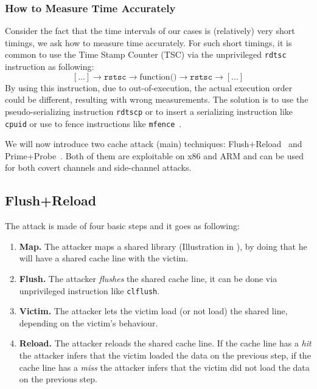 \subsubsection{How to Measure Time Accurately}
\label{subsubsec:howtomeasuretimeaccuractely}
Consider the fact that the time intervals of our cases is (relatively) very
short timings, we ask how to measure time accurately. For such short timings, it
is common to use the Time Stamp Counter (TSC) via the unprivileged
\texttt{rdtsc} instruction as following:
$$[...] \rightarrow \texttt{rstsc} \rightarrow \mbox{function()} \rightarrow
\texttt{rstsc} \rightarrow [...]$$ \noindent By using this instruction, due to
out-of-execution, the actual execution order could be different, resulting with
wrong measurements. The solution is to use the pseudo-serializing instruction
\texttt{rdtscp} or to insert a serializing instruction like \texttt{cpuid} or
use to fence instructions like \texttt{mfence}~\cite{benchmark2010}.

We will now introduce two cache attack (main) techniques:
Flush+Reload~\cite{Gullasch:2011:CGB:2006077.2006784,
Osvik:2006:CAC:2117739.2117741, Yarom2014} and
Prime+Probe~\cite{Percival2009,Osvik:2006:CAC:2117739.2117741,Liu:2015:LCS:2867539.2867673}.
Both of them are exploitable on x86 and ARM and can be used for both covert
channels and side-channel attacks.
\subsection{Flush+Reload}
\label{subsec:flushreload}
The attack is made of four basic steps and it goes as following:
\begin{enumerate}
    \item \textbf{Map. } The attacker maps a shared library (Illustration in
    ), by doing that he will have a shared cache line
    with the victim.
    \item \textbf{Flush.} The attacker \textit{flushes} the shared cache line,
    it can be done via unprivileged instruction like \texttt{clflush}.
    \item \textbf{Victim.} The attacker lets the victim load (or not load) the
    shared line, depending on the victim's behaviour.
    \item \textbf{Reload.} The attacker reloads the shared cache line. If the
    cache line has a \textit{hit} the attacker infers that the victim loaded the
    data on the previous step, if the cache line has a \textit{miss} the
    attacker infers that the victim did not load the data on the previous step.
\end{enumerate}

